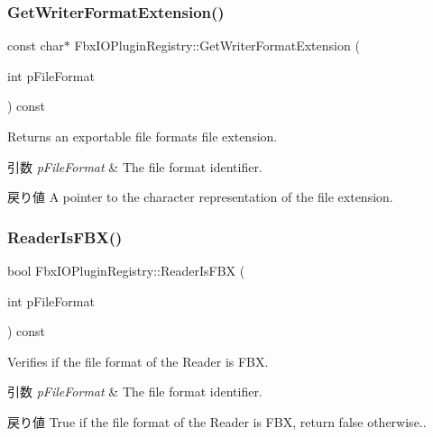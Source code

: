 \subsubsection{\texorpdfstring{Get\+Writer\+Format\+Extension()}{GetWriterFormatExtension()}}
{\footnotesize\ttfamily const char$\ast$ Fbx\+I\+O\+Plugin\+Registry\+::\+Get\+Writer\+Format\+Extension (\begin{DoxyParamCaption}\item[{int}]{p\+File\+Format }\end{DoxyParamCaption}) const}

Returns an exportable file format\textquotesingle{}s file extension. 
\begin{DoxyParams}{引数}
{\em p\+File\+Format} & The file format identifier. \\
\hline
\end{DoxyParams}
\begin{DoxyReturn}{戻り値}
A pointer to the character representation of the file extension. 
\end{DoxyReturn}
\mbox{\label{class_fbx_i_o_plugin_registry_a05eaf29eea6f7b72fd250796dd026791}} 
\subsubsection{\texorpdfstring{Reader\+Is\+F\+B\+X()}{ReaderIsFBX()}}
{\footnotesize\ttfamily bool Fbx\+I\+O\+Plugin\+Registry\+::\+Reader\+Is\+F\+BX (\begin{DoxyParamCaption}\item[{int}]{p\+File\+Format }\end{DoxyParamCaption}) const}

Verifies if the file format of the Reader is F\+BX. 
\begin{DoxyParams}{引数}
{\em p\+File\+Format} & The file format identifier. \\
\hline
\end{DoxyParams}
\begin{DoxyReturn}{戻り値}
{\ttfamily True} if the file format of the Reader is F\+BX, return {\ttfamily false} otherwise.. 
\end{DoxyReturn}
\mbox{\label{class_fbx_i_o_plugin_registry_af737d254762b26d85dab9022c4c41986}} 
